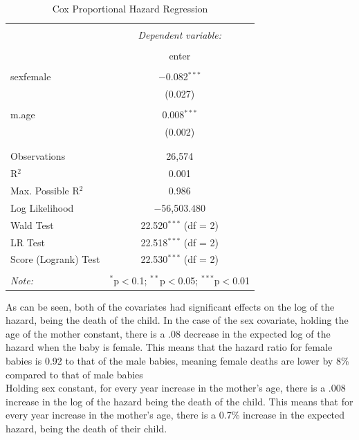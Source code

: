 \documentclass[12pt,letterpaper]{article}
\begin{document}
\begin{table}[!htbp] \centering 
	\caption{Cox Proportional Hazard Regression} 
	\label{} 
	\begin{tabular}{@{\extracolsep{5pt}}lc} 
		\\[-1.8ex]\hline 
		\hline \\[-1.8ex] 
		& \multicolumn{1}{c}{\textit{Dependent variable:}} \\ 
		\cline{2-2} 
		\\[-1.8ex] & enter \\ 
		\hline \\[-1.8ex] 
		sexfemale & $-$0.082$^{***}$ \\ 
		& (0.027) \\ 
		& \\ 
		m.age & 0.008$^{***}$ \\ 
		& (0.002) \\ 
		& \\ 
		\hline \\[-1.8ex] 
		Observations & 26,574 \\ 
		R$^{2}$ & 0.001 \\ 
		Max. Possible R$^{2}$ & 0.986 \\ 
		Log Likelihood & $-$56,503.480 \\ 
		Wald Test & 22.520$^{***}$ (df = 2) \\ 
		LR Test & 22.518$^{***}$ (df = 2) \\ 
		Score (Logrank) Test & 22.530$^{***}$ (df = 2) \\ 
		\hline 
		\hline \\[-1.8ex] 
		\textit{Note:}  & \multicolumn{1}{r}{$^{*}$p$<$0.1; $^{**}$p$<$0.05; $^{***}$p$<$0.01} \\ 
	\end{tabular} 
\end{table} 

\vspace{5in}
\noindent As can be seen, both of the covariates had significant effects on the log of the hazard, being the death of the child. In the case of the sex covariate, holding the age of the mother constant, there is a .08 decrease in the expected log of the hazard when the baby is female. This means that the hazard ratio for female babies is 0.92 to that of the male babies, meaning female deaths are lower by 8\% compared to that of male babies \\

\noindent Holding sex constant, for every year increase in the mother's age, there is a .008 increase in the log of the hazard being the death of the child. This means that for every year increase in the mother's age, there is a 0.7\% increase in the expected hazard, being the death of their child. \\
\end{document}
